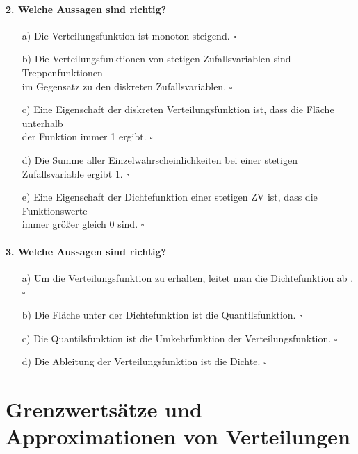 \documentclass[a4paper]{article}
\begin{document}
\paragraph{2. Welche Aussagen sind richtig?}
\begin{itemize}
    \item[a)] Die Verteilungsfunktion ist monoton steigend. \hfill $\square$
    \item[b)] Die Verteilungsfunktionen von stetigen Zufallsvariablen sind Treppenfunktionen \\im Gegensatz zu den diskreten Zufallsvariablen. \hfill $\square$
    \item[c)] Eine Eigenschaft der diskreten Verteilungsfunktion ist, dass die Fläche unterhalb \\der Funktion immer 1 ergibt. \hfill $\square$
    \item[d)] Die Summe aller Einzelwahrscheinlichkeiten bei einer stetigen Zufallsvariable ergibt 1. \hfill $\square$
    \item[e)] Eine Eigenschaft der Dichtefunktion einer stetigen ZV ist, dass die Funktionswerte\\immer größer gleich 0 sind. \hfill $\square$
\end{itemize}

\paragraph{3. Welche Aussagen sind richtig?}
\begin{itemize}
    \item[a)] Um die Verteilungsfunktion zu erhalten, leitet man die Dichtefunktion ab .\hfill $\square$
    \item[b)] Die Fläche unter der Dichtefunktion ist die Quantilsfunktion. \hfill $\square$
    \item[c)] Die Quantilsfunktion ist die Umkehrfunktion der Verteilungsfunktion. \hfill $\square$
    \item[d)] Die Ableitung der Verteilungsfunktion ist die Dichte. \hfill $\square$
\end{itemize}


\clearpage


\section{Grenzwertsätze und Approximationen von Verteilungen} \label{sec:GWSapprox}
\end{document}
